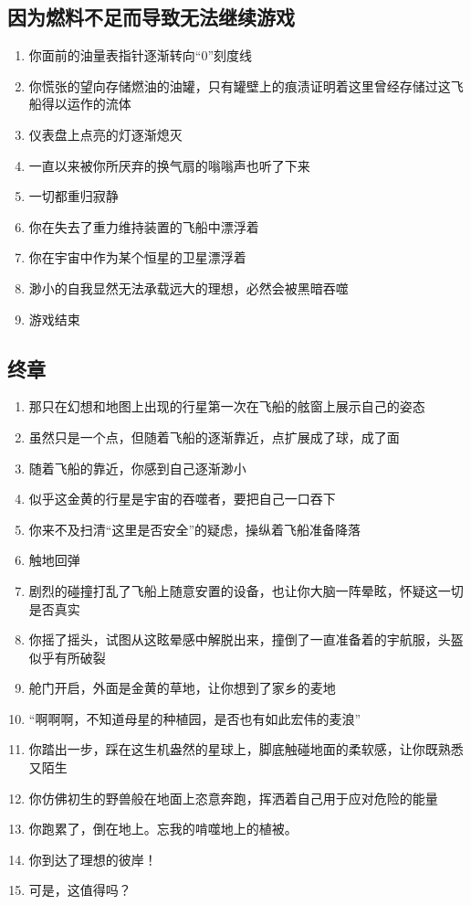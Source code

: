 \documentclass{ctexart}
\begin{document}
		\subsection{因为燃料不足而导致无法继续游戏}
			\begin{enumerate}
				\item 你面前的油量表指针逐渐转向“0”刻度线
				\item 你慌张的望向存储燃油的油罐，只有罐壁上的痕渍证明着这里曾经存储过这飞船得以运作的流体
				\item 仪表盘上点亮的灯逐渐熄灭
				\item 一直以来被你所厌弃的换气扇的嗡嗡声也听了下来
				\item 一切都重归寂静
				\item 你在失去了重力维持装置的飞船中漂浮着
				\item 你在宇宙中作为某个恒星的卫星漂浮着
				\item 渺小的自我显然无法承载远大的理想，必然会被黑暗吞噬
				\item 游戏结束
			\end{enumerate}
		\subsection{终章}
			\begin{enumerate}
				\item 那只在幻想和地图上出现的行星第一次在飞船的舷窗上展示自己的姿态
				\item 虽然只是一个点，但随着飞船的逐渐靠近，点扩展成了球，成了面
				\item 随着飞船的靠近，你感到自己逐渐渺小
				\item 似乎这金黄的行星是宇宙的吞噬者，要把自己一口吞下
				\item 你来不及扫清“这里是否安全”的疑虑，操纵着飞船准备降落
				\item 触地回弹
				\item 剧烈的碰撞打乱了飞船上随意安置的设备，也让你大脑一阵晕眩，怀疑这一切是否真实
				\item 你摇了摇头，试图从这眩晕感中解脱出来，撞倒了一直准备着的宇航服，头盔似乎有所破裂
				\item 舱门开启，外面是金黄的草地，让你想到了家乡的麦地
				\item “啊啊啊，不知道母星的种植园，是否也有如此宏伟的麦浪”
				\item 你踏出一步，踩在这生机盎然的星球上，脚底触碰地面的柔软感，让你既熟悉又陌生
				\item 你仿佛初生的野兽般在地面上恣意奔跑，挥洒着自己用于应对危险的能量
				\item 你跑累了，倒在地上。忘我的啃噬地上的植被。
				\item 你到达了理想的彼岸！
				\item 可是，这值得吗？
			\end{enumerate}
\end{document}
